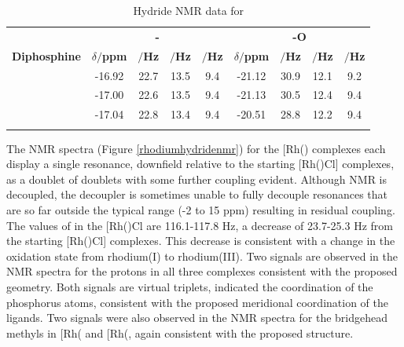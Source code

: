\begin{table}
\caption[Hydride \proton{} NMR data for \ce{[Rh(\POP)Cl(H)2]}]{Hydride \proton{} NMR data for \texorpdfstring{\ce{[Rh(\POP)Cl(H)2]}}R}
\vspace{1em}
\label{table:dihydrides}
\small
\begin{center}
\begin{tabular}{c c c c c c c c c}
\toprule{}
	~~ & \multicolumn{4}{c}{\bfseries{\ce{H-} \trans-\ce{Cl-}}} & \multicolumn{4}{c}{\bfseries{\ce{H-} \trans-O}}\\
	\cmidrule(lr){2-5} \cmidrule(lr){6-9} 
	\bfseries{Diphosphine}&\bfseries{$\delta/$ppm}&\bfseries{\JRhH$/$Hz}&\bfseries{\JPH$/$Hz}&\bfseries{\JHH$/$Hz}&\bfseries{$\delta/$ppm}&\bfseries{\JRhH$/$Hz}&\bfseries{\JPH$/$Hz}&\bfseries{\JHH$/$Hz}\\
	\midrule{}
	\tBuSixantphos & -16.92 & 22.7 & 13.5 & 9.4 & -21.12 & 30.9 & 12.1 & 9.2 \\
	\tBuThixantphos & -17.00 & 22.6 & 13.5 & 9.4 & -21.13 & 30.5 & 12.4 & 9.4 \\
	\tBuXantphos & -17.04 & 22.8 & 13.4 & 9.4 & -20.51 & 28.8 & 12.2 & 9.4 \\
	\bottomrule{}
\end{tabular}
\end{center} 
\end{table}

The \phosphorus{} NMR spectra (Figure \ref{rhodiumhydridenmr}) for the [Rh(\tBuxantphosk)\ce{(H)2Cl]} complexes each display a single resonance, downfield relative to the starting [Rh(\tBuxantphosk)Cl] complexes, as a doublet of doublets with some further coupling evident.  Although \phosphorus{} NMR is \proton{} decoupled, the decoupler is sometimes unable to fully decouple resonances that are so far outside the typical \proton{} range (-2 to 15 ppm) resulting in residual coupling.  The values of \JRhP{} in the [Rh(\tBuxantphosk)Cl\ce{(H)2]} are 116.1-117.8 Hz, a decrease of 23.7-25.3 Hz from the starting [Rh(\tBuxantphosk)Cl] complexes.  This decrease is consistent with a change in the oxidation state from rhodium(I) to rhodium(III).  
Two signals are observed in the \proton{} NMR spectra for the \tBu{} protons in all three complexes consistent with the proposed geometry.  Both signals are virtual triplets, indicated the \trans{} coordination of the phosphorus atoms, consistent with the proposed meridional coordination of the ligands.  Two signals were also observed in the \proton{} NMR spectra for the bridgehead methyls in [Rh(\tBuxantphosk\ce{)(H)2Cl]} and [Rh(\tBusixantphosk\ce{)(H)2Cl]}, again consistent with the proposed structure.  

